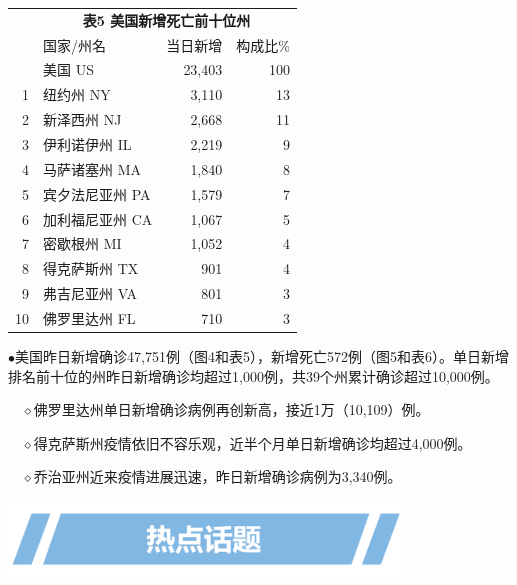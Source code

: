 \documentclass[
]{article}
\begin{document}
\begin{table}[H]
\begin{table}[H]
\begin{tabular}{rlrr}
\toprule
\multicolumn{0}{c}{\textbf{ }} & \multicolumn{3}{c}{\textbf{表5 美国新增死亡前十位州}} \\
  & 国家/州名 & 当日新增 & 构成比\%\\
\midrule
\rowcolor{gray!6}   & 美国 US & 23,403 & 100\\
1 & 纽约州 NY & 3,110 & 13\\
\rowcolor{gray!6}  2 & 新泽西州 NJ & 2,668 & 11\\
3 & 伊利诺伊州 IL & 2,219 & 9\\
\rowcolor{gray!6}  4 & 马萨诸塞州 MA & 1,840 & 8\\
5 & 宾夕法尼亚州 PA & 1,579 & 7\\
\rowcolor{gray!6}  6 & 加利福尼亚州 CA & 1,067 & 5\\
7 & 密歇根州 MI & 1,052 & 4\\
\rowcolor{gray!6}  8 & 得克萨斯州 TX & 901 & 4\\
9 & 弗吉尼亚州 VA & 801 & 3\\
\rowcolor{gray!6}  10 & 佛罗里达州 FL & 710 & 3\\
\bottomrule
\end{tabular}
\endgroup{}
\end{table} \begin{tablenotes}
        \fontsize{15}{15}
        \selectfont
        \item 
      \end{tablenotes}
\end{table}

\(\bullet\)美国昨日新增确诊47,751例（图4和表5），新增死亡572例（图5和表6）。单日新增排名前十位的州昨日新增确诊均超过1,000例，共39个州累计确诊超过10,000例。

\(\quad\)\(\diamond\)佛罗里达州单日新增确诊病例再创新高，接近1万（10,109）例。

\(\quad\)\(\diamond\)得克萨斯州疫情依旧不容乐观，近半个月单日新增确诊均超过4,000例。

\(\quad\)\(\diamond\)乔治亚州近来疫情进展迅速，昨日新增确诊病例为3,340例。

\vspace{15mm}

\begin{center}
\includegraphics[height=2cm]{./input/title3.png} 
\end{center}
\vspace{-7mm}
\end{document}
